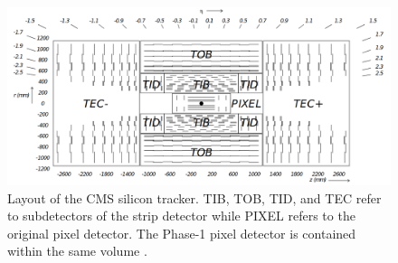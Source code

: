 \begin{figure}[hbtp]
\centering
\includegraphics[scale=0.2]{figures/lhc_and_cms/tracker_layout.png}
\caption{Layout of the CMS silicon tracker. TIB, TOB, TID, and TEC refer to subdetectors of the strip detector while PIXEL refers to the original pixel detector. The Phase-1 pixel detector is contained within the same volume \cite{cms_experiment}.}
\label{tracker_layout}
\end{figure}